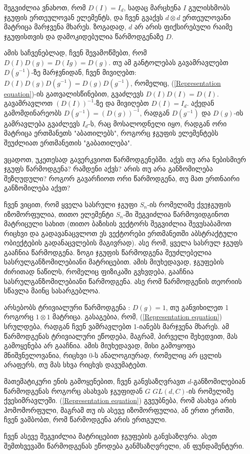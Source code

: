 \documentclass[12pt]{article}
\begin{document}
\begin{sloppypar}
შეგვიძლია ვნახოთ, რომ $D(I) = I_d$, სადაც მარცხენა $I$ გულისხმობს ჯგუფის ერთეულოვან ელემენტს, და ჩვენ გვაქვს $d \otimes d$ ერთეულოვანი მატრიცა მარჯვენა მხარეს. ზოგადად, $d$ არ არის ფიქსირებული რაიმე ჯგუფისთვის და დამოკიდებულია წარმოდგენაზე $D$. 

ამის საჩვენებლად, ჩვენ შევამოწმებთ, რომ 
$D(I)D(g) = D(Ig) = D(g)$. თუ ამ განტოლებას გავამრავლებთ $D(g^{-1})$-ზე მარჯვნიდან, ჩვენ მივიღებთ: $D(I)D(g)D(g^{-1}) = D(g)D(g^{-1})$, რომელიც, (\ref{Representation equation})-ის გათვალისწინებით, გვაძლევს $D(I)D(I) = D(I)$. გავამრავლოთ $(D(I))^{-1}$-ზე და მივიღებთ $D(I) = I_d$.
აქედან გამომდინარეობს $D(g^{-1}) = (D(g))^{-1}$, რადგან $D(g^{-1})$ და $D(g)$-ის გამრავლება გვაძლევს $I_d$-ს, რაც მოსალოდნელი იყო, რადგან ორი მატრიცა ერთმანეთს "აბათილებს", როგორც ჯგუფის ელემენტებს შეუძლიათ ერთმანეთის "გაბათილება".

ვცადოთ, უკეთესად გავერკვიოთ წარმოდგენებში. აქვს თუ არა ნებისმიერ ჯგუფს წარმოდგენა? რამდენი აქვს? არის თუ არა განზომილება შეზღუდული? როგორ გავარჩიოთ ორი წარმოდგენა, თუ მათ ერთნაირი განზომილება აქვთ?

ჩვენ ვიცით, რომ ყველა სასრული ჯგუფი $S_n$-ის რომელიმე ქვეჯგუფის იზომორფულია, თითო ელემენტი $S_n$-ში შეგვიძლია წარმოვიდგინოთ მატრიცული სახით (თითო ბაზისის ვექტორს შეგვიძლია შევუსაბამოთ რიცხვი და გადავანაცვლოთ ეს ვექტორები ერთმანეთში აბსტრაქტული ობიექტების გადანაცვლების მაგივრად). ასე რომ, ყველა სასრულ ჯგუფს გააჩნია წარმოდგენა. ზოგი ჯგუფის წარმოდგენა შეუძლებელია სასრულგანზომილებიანი მატრიცებით. ამის მიუხედავად, ჯგუფების ძირითად ნაწილს, რომელიც ფიზიკაში გვხვდება, გააჩნია სასრულგანზომილებიანი წარმოდგენა. ასე რომ წარმოდგენის თეორიის სწავლა მაინც სასარგებლოა.
 
არსებობს ტრივიალური წარმოდგენა : $D(g) = 1$, თუ განვიხილეთ 1 როგორც $1 \otimes 1$ მატრიცა. გასაგებია, რომ, (\ref{Representation equation}) სრულდება, რადგან ჩვენ ვამრავლებთ 1-იანებს მარჯვენა მხარეს. ამ წარმოდგენას ტრივიალური ეწოდება, მაგრამ, პირველი შეხედვით, მას გამოყენება არ გააჩნია. ამის მიუხედავად, მისი გამოყოფა მნიშვნელოვანია, რიცხვი 0-ს ანალოგიურად, რომელიც არ ცვლის არაფერს, თუ მას სხვა რიცხვს დავუმატებთ.

მათემატიკური ენის გამოყენებით, ჩვენ განვსაზღვრავთ $d$-განზომილებიან წარმოდგენას როგორც ასახვას ჯგუფიდან $G$ $GL(d, C)$-ის რომელიმე ქვესიმრავლეში. (\ref{Representation equation}) გვეუბნება, რომ ასახვა არის ჰომომორფული, მაგრამ თუ ის ასევე იზომორფულია, ან ერთი ერთში, ჩვენ ვამბობთ, რომ წარმოდგენა არის ერთგული.

ჩვენ ასევე შეგვიძლია მატრიცებით ჯგუფების განვსაზღვრა. ასეთ შემთხვევაში წარმოდგენას ეწოდება განმსაზღვრელი, ან ფუნდამენტური.


\end{sloppypar}
\end{document}
